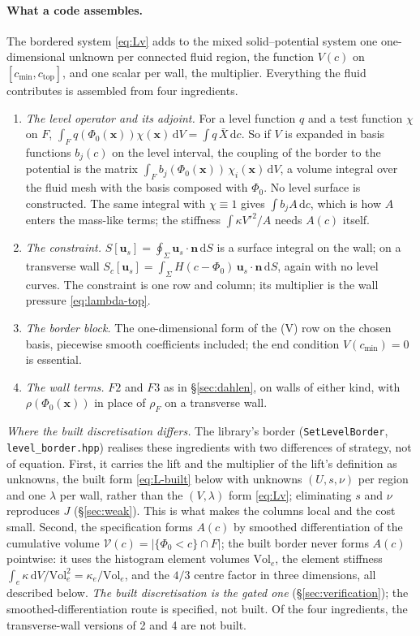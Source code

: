 \documentclass[11pt]{article}
\theoremstyle{definition}
\theoremstyle{remark}
\newcommand{\bu}{\mathbf{u}}
\newcommand{\bn}{\mathbf{n}}
\newcommand{\bx}{\mathbf{x}}
\newcommand{\dS}{\,\mathrm{d}S}
\newcommand{\dV}{\,\mathrm{d}V}
\newcommand{\dc}{\,\mathrm{d}c}
\newcommand{\Vol}{\mathcal V}
\newcommand{\code}[1]{\texttt{#1}}
\begin{document}
\paragraph{What a code assembles.} The bordered system \eqref{eq:Lv}
adds to the mixed solid--potential system one one-dimensional unknown
per connected fluid region, the function $V(c)$ on $[c_{\min},
c_{\mathrm{top}}]$, and one scalar per wall, the multiplier.
Everything the fluid contributes is assembled from four ingredients.
\begin{enumerate}
\item \emph{The level operator and its adjoint.} For a level function
  $q$ and a test function $\chi$ on $F$, $\int_Fq(\Phi_0(\bx))\chi(\bx)
  \dV = \int q\,\bar X\dc$. So if $V$ is expanded in basis functions
  $b_j(c)$ on the level interval, the coupling of the border to the
  potential is the matrix $\int_Fb_j(\Phi_0(\bx))\,\chi_i(\bx)\dV$, a
  volume integral over the fluid mesh with the basis composed with
  $\Phi_0$. No level surface is constructed. The same integral with
  $\chi \equiv 1$ gives $\int b_jA\dc$, which is how $A$ enters the
  mass-like terms; the stiffness $\int\kappa V'^2/A$ needs $A(c)$
  itself.
\item \emph{The constraint.} $S[\bu_s] = \oint_\Sigma\bu_s\cdot\bn\dS$
  is a surface integral on the wall; on a transverse wall $S_c[\bu_s] =
  \int_\Sigma H(c - \Phi_0)\,\bu_s\cdot\bn\dS$, again with no level
  curves. The constraint is one row and column; its multiplier is the
  wall pressure \eqref{eq:lambda-top}.
\item \emph{The border block.} The one-dimensional form of the (V) row
  on the chosen basis, piecewise smooth coefficients included; the end
  condition $V(c_{\min}) = 0$ is essential.
\item \emph{The wall terms.} $F2$ and $F3$ as in \S\ref{sec:dahlen}, on
  walls of either kind, with $\rho(\Phi_0(\bx))$ in place of $\rho_F$ on
  a transverse wall.
\end{enumerate}
\emph{Where the built discretisation differs.} The library's border
(\code{SetLevelBorder}, \code{level\_border.hpp}) realises these
ingredients with two differences of strategy, not of equation. First,
it carries the lift and the multiplier of the lift's definition as
unknowns, the built form \eqref{eq:L-built} below with unknowns
$(U, s, \nu)$ per region and one $\lambda$ per wall, rather than the
$(V, \lambda)$ form \eqref{eq:Lv}; eliminating $s$ and $\nu$
reproduces $J$ (\S\ref{sec:weak}). This is what makes the columns
local and the cost small. Second, the specification forms $A(c)$
by smoothed differentiation of the cumulative volume $\Vol(c) =
|\{\Phi_0 < c\}\cap F|$; the built border never forms $A(c)$
pointwise: it uses the histogram element volumes $\mathrm{Vol}_e$, the
element stiffness $\int_e\kappa\dV/\mathrm{Vol}_e^2 = \kappa_e/
\mathrm{Vol}_e$, and the $4/3$ centre factor in three dimensions, all
described below. \emph{The built discretisation is the
gated one} (\S\ref{sec:verification}); the smoothed-differentiation
route is specified, not built. Of the four ingredients, the
transverse-wall versions of 2 and 4 are not built.
\end{document}
